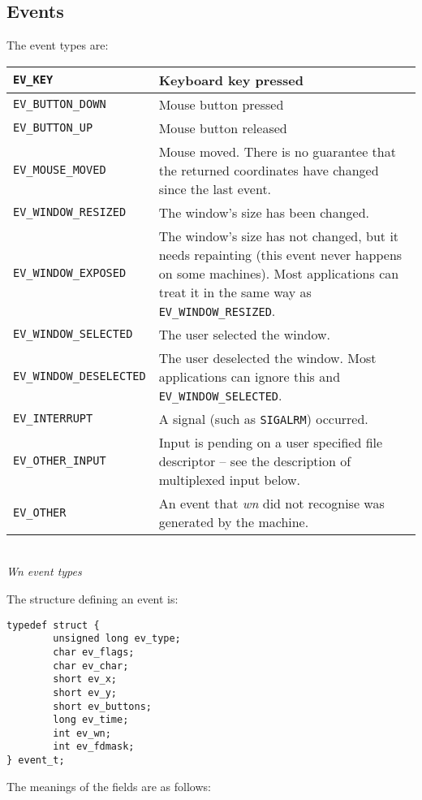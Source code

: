 \subsection{Events}
The event types are:
\begin{center}
\begin{tabular}{|l|p{4in}|} \hline
{\tt EV\_KEY} & Keyboard key pressed \\ \hline
{\tt EV\_BUTTON\_DOWN} & Mouse button pressed \\ \hline
{\tt EV\_BUTTON\_UP} & Mouse button released \\ \hline
{\tt EV\_MOUSE\_MOVED} & Mouse moved.
There is no guarantee that the returned coordinates have changed since the
last event. \\ \hline
{\tt EV\_WINDOW\_RESIZED} & The window's size has been changed. \\ \hline
{\tt EV\_WINDOW\_EXPOSED} & The window's size has not changed, but it needs
repainting (this event never happens on some machines).
Most applications can treat it in the same way as {\tt EV\_WINDOW\_RESIZED}. \\ \hline
{\tt EV\_WINDOW\_SELECTED} & The user selected the window. \\ \hline
{\tt EV\_WINDOW\_DESELECTED} & The user deselected the window.
Most applications can ignore this and {\tt EV\_WINDOW\_SELECTED}. \\ \hline
{\tt EV\_INTERRUPT} & A signal (such as {\tt SIGALRM}) occurred. \\ \hline
{\tt EV\_OTHER\_INPUT} &
Input is pending on a user specified file descriptor -- see the description
of multiplexed input below. \\ \hline
{\tt EV\_OTHER} & An event that {\em wn} did not recognise was generated by the machine. \\ \hline
\end{tabular}\\[0.1in]
{\em Wn event types}
\end{center}
The structure defining an event is:
\begin{verbatim}
typedef struct {
        unsigned long ev_type;
        char ev_flags;
        char ev_char;
        short ev_x;
        short ev_y;
        short ev_buttons;
        long ev_time;
        int ev_wn;
        int ev_fdmask;
} event_t;
\end{verbatim}
The meanings of the fields are as follows:
